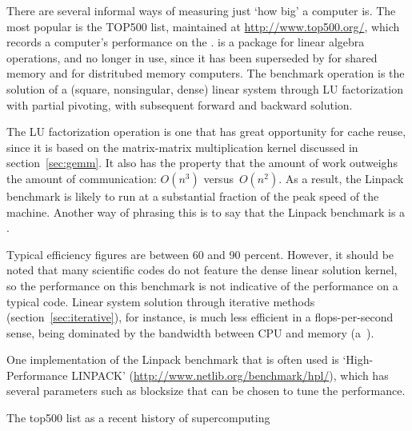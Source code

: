 There are several informal ways of measuring just `how big' a computer
is. The most popular is the TOP500 list, maintained at
\url{http://www.top500.org/}, which records a computer's performance
on the .  is a
package for linear algebra operations, and no longer in use, since it
has been superseded by  for shared memory and
 for distritubed memory computers. The benchmark
operation is the solution of a (square, nonsingular, dense) linear
system through LU factorization with partial pivoting, with subsequent
forward and backward solution.

The LU factorization operation is one that has great opportunity for
cache reuse, since it is based on the matrix-matrix multiplication
kernel discussed in section~\ref{sec:gemm}. It also has the property
that the amount of work outweighs the amount of communication:
$O(n^3)$ versus~$O(n^2)$.
As a result, the 
Linpack benchmark is likely to run at a substantial fraction of the
peak speed of the machine. Another way of phrasing this is to say that
the Linpack benchmark is a .

Typical efficiency figures are between 60 and 90 percent. However, it
should be noted that many scientific codes do not feature the dense
linear solution kernel, so the performance on this benchmark is not
indicative of the performance on a typical code. Linear system
solution through iterative methods (section~\ref{sec:iterative}), for
instance, is much less efficient in a flops-per-second sense, being
dominated by the bandwidth between CPU and memory
(a~).

One implementation of the Linpack benchmark that is often used is
`High-Performance LINPACK'
(\url{http://www.netlib.org/benchmark/hpl/}), which has several
parameters such as blocksize that can be chosen to tune the performance.

 {The top500 list as a recent history of supercomputing}

